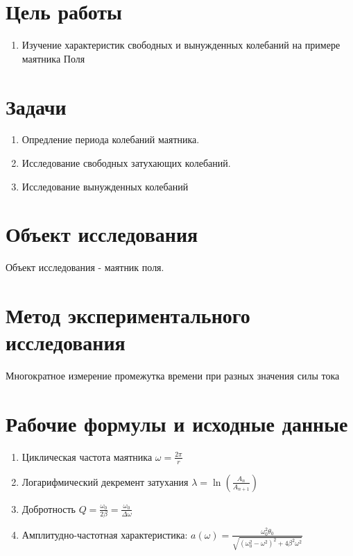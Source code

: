 \section{Цель работы}
\begin{enumerate}
	\item Изучение характеристик свободных и вынужденных колебаний на примере маятника Поля
\end{enumerate}

\section{Задачи}
\begin{enumerate}
	\item Опредление периода колебаний маятника.
	\item Исследование свободных затухающих колебаний.
	\item Исследование вынужденных колебаний
\end{enumerate}

\section{Объект исследования}
Объект исследования - маятник поля.

\section{Метод экспериментального исследования}
Многократное измерение промежутка времени при разных значения силы тока

\section{Рабочие формулы и исходные данные}
\begin{enumerate}
	\item Циклическая частота маятника $\omega = \frac{2\pi}{r}$
	\item Логарифмический декремент затухания $\lambda = \ln \left( \frac{A_n}{A_{n+1}} \right)$
	\item Добротность $Q = \frac{\omega_0}{2 \beta} = \frac{\omega_0}{\Delta \omega}$
	\item Амплитудно-частотная характеристика:
	      $ a(\omega) = \frac{\omega_0^2 \theta_0}{\sqrt{(\omega_0^2 - \omega^2)^2 + 4 \beta^2 \omega^2}} $
\end{enumerate}

